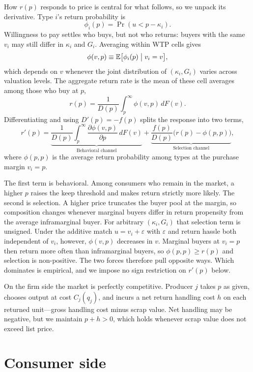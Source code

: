 \documentclass[11pt]{article}
\begin{document}
How $r(p)$ responds to price is central for what follows, so we unpack its
derivative.  Type $i$'s return probability is
\[
  \phi_i(p)=\Pr(u<p-\kappa_i).
\]
Willingness to pay settles who buys, but not who returns: buyers with the same
$v_i$ may still differ in $\kappa_i$ and $G_i$.  Averaging within WTP cells
gives
\[
  \phi(v,p)\equiv\mathbb{E}\bigl[\phi_i(p)\bigm|v_i=v\bigr],
\]
which depends on $v$ whenever the joint distribution of $(\kappa_i,G_i)$ varies
across valuation levels.  The aggregate return rate is the mean of these cell
averages among those who buy at $p$,
\[
  r(p)=\frac{1}{D(p)}\int_p^\infty \phi(v,p)\,dF(v).
\]
Differentiating and using $D'(p)=-f(p)$ splits the response into two terms,
\[
  r'(p)
  =
  \underbrace{
    \frac{1}{D(p)}\int_p^\infty \frac{\partial \phi(v,p)}{\partial p}\,dF(v)
  }_{\text{Behavioral channel}}
  +
  \underbrace{
    \frac{f(p)}{D(p)}\bigl(r(p)-\phi(p,p)\bigr)
  }_{\text{Selection channel}},
\]
where $\phi(p,p)$ is the average return probability among types at the
purchase margin $v_i=p$.

The first term is behavioral.  Among consumers who remain in the market, a
higher $p$ raises the keep threshold and makes return strictly more likely.
The second is selection.  A higher price truncates the buyer pool at the
margin, so composition changes whenever marginal buyers differ in return
propensity from the average inframarginal buyer.  For arbitrary
$(\kappa_i,G_i)$ that selection term is unsigned.  Under the additive match
$u=v_i+\varepsilon$ with $\varepsilon$ and return hassle both independent of
$v_i$, however, $\phi(v,p)$ decreases in $v$.  Marginal buyers at $v_i=p$ then
return more often than inframarginal buyers, so $\phi(p,p)\geq r(p)$ and
selection is non-positive.  The two forces therefore pull opposite ways.
Which dominates is empirical, and we impose no sign restriction on $r'(p)$
below.

On the firm side the market is perfectly competitive.  Producer $j$ takes $p$
as given, chooses output at cost $C_j(q_j)$, and incurs a net return handling
cost $h$ on each returned unit---gross handling cost minus scrap value.  Net
handling may be negative, but we maintain $p+h>0$, which holds whenever scrap
value does not exceed list price.

\section{Consumer side}
\end{document}
